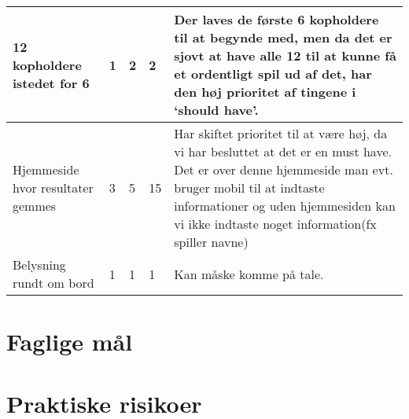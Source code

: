 \documentclass{article}
\begin{document}
\begin{table}[H]
{\begin{tabular}{|p{5cm}|p{1cm}|p{1.2cm}|p{1.2cm}|p{5cm}|}
12 kopholdere istedet for 6 & 1 & 2 & 2 & Der laves de første 6 kopholdere til at begynde med, men da det er sjovt at have alle 12 til at kunne få et ordentligt spil ud af det, har den høj prioritet af tingene i ‘should have’. \\ \hline
Hjemmeside hvor resultater gemmes & 3 & 5 & 15 & Har skiftet prioritet til at være høj, da vi har besluttet at det er en must have. Det er over denne hjemmeside man evt. bruger mobil til at indtaste informationer og uden hjemmesiden kan vi ikke indtaste noget information(fx spiller navne) \\ \hline
Belysning rundt om bord & 1 & 1 & 1 & Kan måske komme på tale. \\ \hline

\end{tabular}%
}
\end{table}

\section{Faglige mål}

\begin{table}[H]
\end{table}

\section{Praktiske risikoer}
\end{document}
